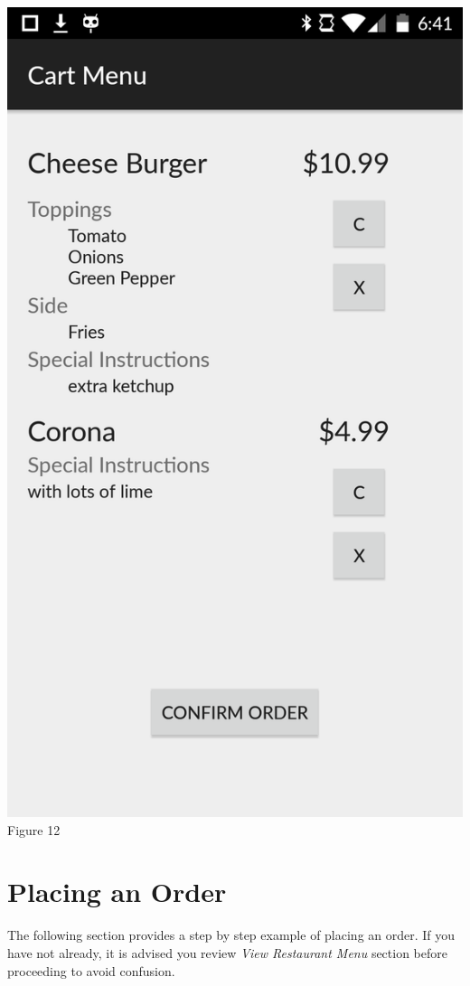\documentclass[12pt, titlepage]{article}
\begin{document}
\begin{center}\includegraphics[scale=0.15]{cart.png}	\linebreak Figure 12\end{center}

\section{Placing an Order}
The following section provides a step by step example of placing an order. If you have not already, it is advised you review \emph{View Restaurant Menu} section before proceeding to avoid confusion. 
\end{document}

